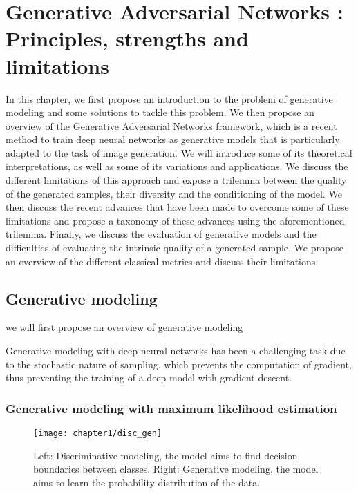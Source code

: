 \chapter{Generative Adversarial Networks : Principles, strengths and limitations}
\label{chap:chapter1}

\begin{chapterabstract}
	In this chapter, we first propose an introduction to the problem of generative modeling and some solutions to tackle this problem. We then propose an overview of the Generative Adversarial Networks \cite{Goodfellow2014} framework, which is a recent method to train deep neural networks as generative models that is particularly adapted to the task of image generation. We will introduce some of its theoretical interpretations, as well as some of its variations and applications. We discuss the different limitations of this approach and expose a trilemma between the quality of the generated samples, their diversity and the conditioning of the model. We then discuss the recent advances that have been made to overcome some of these limitations and propose a taxonomy of these advances using the aforementioned trilemma. Finally, we discuss the evaluation of generative models and the difficulties of evaluating the intrinsic quality of a generated sample.  We propose an overview of the different classical metrics and discuss their limitations.
\end{chapterabstract}

\minitoc
\newpage

\section{Generative modeling}
we will first propose an overview of generative modeling

Generative modeling with deep neural networks has been a challenging task due to the stochastic nature of sampling, which prevents the computation of gradient, thus preventing the training of a deep model with gradient descent.  %

\subsection{Generative modeling with maximum likelihood estimation}

\begin{figure}
	\centering
	\texttt{[image: chapter1/disc\_gen]}
	\caption[Generative modeling]{Left: Discriminative modeling, the model aims to find decision boundaries between classes. Right: Generative modeling, the model aims to learn the probability distribution of the data.}
	\label{fig:disc_gen}
\end{figure}

